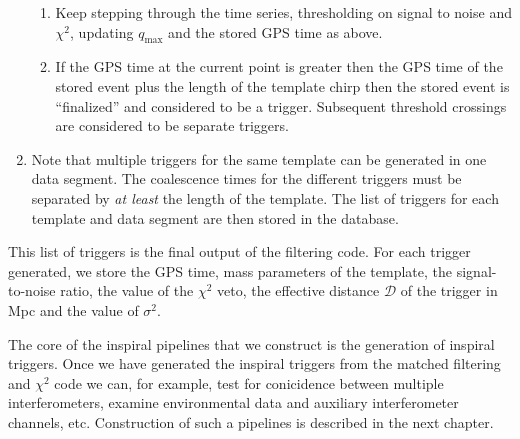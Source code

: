 \begin{enumerate}
\begin{enumerate}
\item Keep stepping through the time series, thresholding on signal to noise
and $\chi^2$, updating $q_{\mathrm{max}}$ and the stored GPS time as above.

\item If the GPS time at the current point is greater then the GPS time of the
stored event plus the length of the template chirp then the stored event is
``finalized'' and considered to be a trigger. Subsequent threshold crossings are
considered to be separate triggers.
\end{enumerate}

\item Note that multiple triggers for the same template can be generated in
one data segment. The coalescence times for the different triggers must be
separated by \textit{at least} the length of the template.  The list of
triggers for each template and data segment are then stored in the database. 
\end{enumerate}

This list of triggers is the final output of the filtering code. For each
trigger generated, we store the GPS time, mass parameters of the template,
the signal-to-noise ratio, the value of the $\chi^2$ veto, the effective
distance $\mathcal{D}$ of the trigger in Mpc and the value of $\sigma^2$.

The core of the inspiral pipelines that we construct is the generation of
inspiral triggers. Once we have generated the inspiral triggers from the
matched filtering and $\chi^2$ code we can, for example, test for conicidence
between multiple interferometers, examine environmental data and auxiliary
interferometer channels, etc. Construction of such a pipelines is described in
the next chapter.

